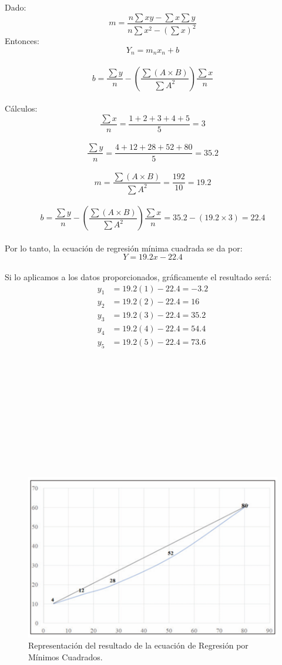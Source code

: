 \documentclass[]{article}
\begin{document}
	
	Dado:
	\[
	m = \frac{n \sum xy - \sum x \sum y}{n \sum x^{2} - (\sum x)^2}
	\]
	Entonces:
	\[
	Y_n = m_n x_n + b 
	\]
	\\
	\[
	b = \frac{\sum y}{n} - \left( \frac{\sum (A \times B)}{\sum A^2} \right) \frac{\sum x}{n} 
	\]
	\\

	Cálculos:\\
	\[
	\frac{\sum x}{n} = \frac{1 + 2 + 3 + 4 + 5}{5} = 3
	\]
	\\
	\[
	\frac{\sum y}{n} = \frac{4 + 12 + 28 + 52 + 80}{5} = 35.2
	\]
	\\
	\[
	m = \frac{\sum (A \times B)}{\sum A^2} = \frac{192}{10} = 19.2
	\]
	\\
	\[
	b = \frac{\sum y}{n} - \left( \frac{\sum (A \times B)}{\sum A^2} \right) \frac{\sum x}{n} = 35.2 - (19.2 \times 3) = 22.4
	\]
	\\
	Por lo tanto, la ecuación de regresión mínima cuadrada se da por:\\
	\[
	Y = 19.2x - 22.4
	\]
	\\
	Si lo aplicamos a los datos proporcionados, gráficamente el resultado será:
	\\
	\[
	\begin{aligned}
		y_1 &= 19.2(1) - 22.4 = -3.2 \\
		y_2 &= 19.2(2) - 22.4 = 16 \\
		y_3 &= 19.2(3) - 22.4 = 35.2 \\
		y_4 &= 19.2(4) - 22.4 = 54.4 \\
		y_5 &= 19.2(5) - 22.4 = 73.6 \\
	\end{aligned}
	\]
	\\
	\\
	\\
	\\
	\\
	\\
	\\
	\\
	\\
	\\
	\begin{figure}[!h]
		\centering
		\includegraphics[width=0.7\linewidth]{imagenes/Imagen2}
		\caption{Representación del resultado de la ecuación de Regresión por Mínimos Cuadrados.}
		\label{fig:Imagen2}
	\end{figure}
	
\end{document}
